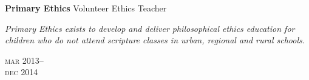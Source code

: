 \begin{minipage}[t]{0.75\textwidth}
\textbf{Primary Ethics}\phantom{..} Volunteer Ethics Teacher \\
{\small
\textit{Primary Ethics exists to develop and deliver philosophical ethics education for children who do not attend scripture classes in urban, regional and rural schools.}
\par}
\end{minipage}
\begin{minipage}[t]{0.25\textwidth}
{
\hfill \textsc{mar} 2013--\\ 
\hspace*{0pt} \hfill \textsc{dec} 2014
\par
}
\end{minipage}


